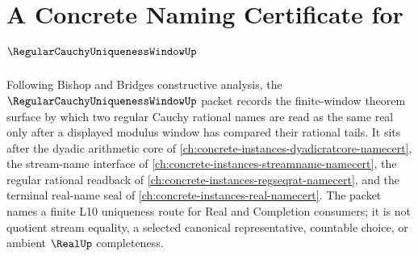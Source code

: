 \chapter{A Concrete Naming Certificate for $\RegularCauchyUniquenessWindowUp$}
\label{ch:concrete-instances-regular-cauchy-uniqueness-window-namecert}

Following Bishop and Bridges constructive analysis, the $\RegularCauchyUniquenessWindowUp$ packet records the finite-window theorem surface by which two regular Cauchy rational names are read as the same real only after a displayed modulus window has compared their rational tails. It sits after the dyadic arithmetic core of \autoref{ch:concrete-instances-dyadicratcore-namecert}, the stream-name interface of \autoref{ch:concrete-instances-streamname-namecert}, the regular rational readback of \autoref{ch:concrete-instances-regseqrat-namecert}, and the terminal real-name seal of \autoref{ch:concrete-instances-real-namecert}. The packet names a finite L10 uniqueness route for Real and Completion consumers; it is not quotient stream equality, a selected canonical representative, countable choice, or ambient $\RealUp$ completeness.

